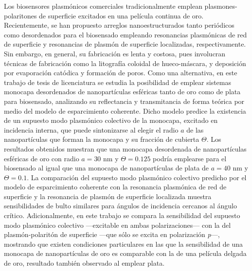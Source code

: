 

\begin{abstracts}        %
\vspace*{-.75cm}
\small
Los biosensores plasmónicos comerciales tradicionalmente emplean plasmones-polaritones de superficie excitados en una película continua de oro. Recientemente, se han propuesto arreglos nanoestructurados tanto periódicos como desordenados para el biosensado empleando resonancias plasmónicas de red de superficie  y  resonancias de plasmón de superficie localizadas,  respectivamente. Sin embargo, en general, su fabricación es lenta y costosa, pues involucran técnicas de fabricación como la litografía coloidal de hueco-máscara, y deposición por evaporación catódica y  formación de poros. Como una alternativa, en este trabajo de tesis de licenciatura se estudia la posibilidad de emplear sistemas monocapa desordenados de nanopartículas esféricas tanto de oro como de plata para biosensado, analizando su reflectancia y transmitancia de forma teórica por medio del modelo de esparcimiento coherente. Dicho modelo predice la existencia de un supuesto modo  plasmónico colectivo de la monocapa, excitado en incidencia interna, que puede sintonizarse al elegir el radio $a$ de las nanopartículas que forman la monocapa y su fracción de cubierta $\Theta$. Los resultados obtenidos muestran que una monocapa desordenada de nanopartículas esféricas de oro con radio $a=30$ nm y $\Theta=0.125$ podría emplearse para el biosensado al igual que una monocapa de nanopartículas de plata de $a=40$ nm y $\Theta=0.1$. La comparación del supuesto modo plasmónico colectivo predicho por el modelo de esparcimiento coherente con la resonancia plasmónica de red de superficie y la resonancia de plasmón de superficie localizada muestra sensibilidades de bulto similares para ángulos de incidencia cercanos al ángulo crítico. Adicionalmente, en este trabajo se compara la sensibilidad del supuesto modo plasmónico colectivo ---excitable en ambas polarizaciones--- con la del plasmón-polaritón de superficie ---que sólo se excita en polarización \emph{p}---,  mostrando que existen condiciones particulares en las que la sensibilidad de una monocapa de nanopartículas de oro es comparable con la de una película delgada de oro, resultado también observado al emplear plata.


\end{abstracts}
